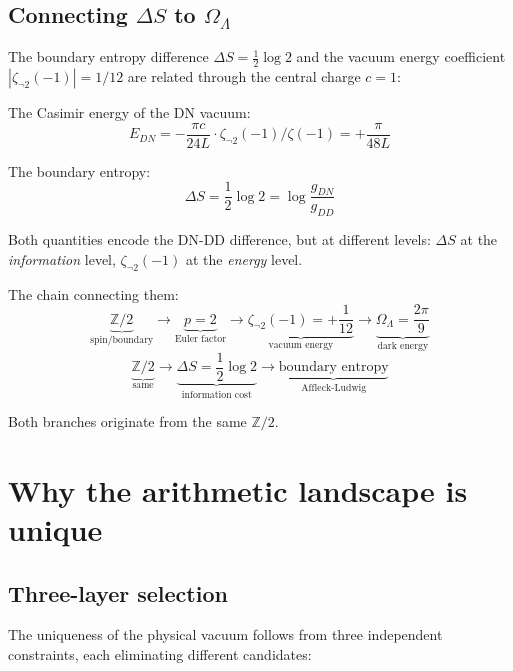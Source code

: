 \documentclass[11pt,a4paper]{article}
\begin{document}
\subsection{Connecting $\Delta S$ to $\Omega_\Lambda$}

The boundary entropy difference $\Delta S = \frac{1}{2}\log 2$
and the vacuum energy coefficient $|\zeta_{\neg 2}(-1)| = 1/12$
are related through the central charge $c = 1$:

The Casimir energy of the DN vacuum:
\begin{equation}
E_{DN} = -\frac{\pi c}{24 L}\cdot\zeta_{\neg 2}(-1)/\zeta(-1) = +\frac{\pi}{48 L}
\end{equation}

The boundary entropy:
\begin{equation}
\Delta S = \frac{1}{2}\log 2 = \log\frac{g_{DN}}{g_{DD}}
\end{equation}

Both quantities encode the DN-DD difference, but at different
levels: $\Delta S$ at the \emph{information} level,
$\zeta_{\neg 2}(-1)$ at the \emph{energy} level.

The chain connecting them:
\begin{equation}
\underbrace{\mathbb{Z}/2}_{\text{spin/boundary}}
\to \underbrace{p = 2}_{\text{Euler factor}}
\to \underbrace{\zeta_{\neg 2}(-1) = +\frac{1}{12}}_{\text{vacuum energy}}
\to \underbrace{\Omega_\Lambda = \frac{2\pi}{9}}_{\text{dark energy}}
\end{equation}
\begin{equation}
\underbrace{\mathbb{Z}/2}_{\text{same}}
\to \underbrace{\Delta S = \frac{1}{2}\log 2}_{\text{information cost}}
\to \underbrace{\text{boundary entropy}}_{\text{Affleck-Ludwig}}
\end{equation}

Both branches originate from the same $\mathbb{Z}/2$.

\section{Why the arithmetic landscape is unique}

\subsection{Three-layer selection}

The uniqueness of the physical vacuum follows from three
independent constraints, each eliminating different candidates:
\end{document}
